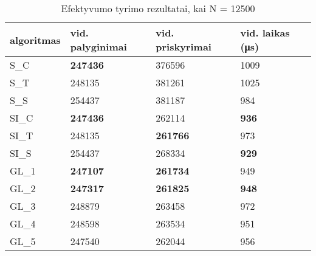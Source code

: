 \documentclass{VUMIFInfKursinis}
\begin{document}
\begin{table}[H]
  \caption{Efektyvumo tyrimo rezultatai, kai N = 12500}
  \label{results_12500}
  \centering
  \begin{tabular}{llll}
    algoritmas & vid. palyginimai                        & vid. priskyrimai                        & vid. laikas (μs)                     \\ \midrule
    S\_C       & \cellcolor[HTML]{70AD47}\textbf{247436} & 376596                                  & 1009                                 \\
    S\_T       & 248135                                  & 381261                                  & 1025                                 \\
    S\_S       & 254437                                  & 381187                                  & 984                                  \\
    SI\_C      & \cellcolor[HTML]{70AD47}\textbf{247436} & 262114                                  & \cellcolor[HTML]{70AD47}\textbf{936} \\
    SI\_T      & 248135                                  & \cellcolor[HTML]{70AD47}\textbf{261766} & 973                                  \\
    SI\_S      & 254437                                  & 268334                                  & \cellcolor[HTML]{70AD47}\textbf{929} \\
    GL\_1      & \cellcolor[HTML]{70AD47}\textbf{247107} & \cellcolor[HTML]{70AD47}\textbf{261734} & 949                                  \\
    GL\_2 & \cellcolor[HTML]{70AD47}\textbf{247317} & \cellcolor[HTML]{70AD47}\textbf{261825} & \cellcolor[HTML]{70AD47}\textbf{948} \\
    GL\_3      & 248879                                  & 263458                                  & 972                                  \\
    GL\_4      & 248598                                  & 263534                                  & 951                                  \\
    GL\_5      & 247540                                  & 262044                                  & 956                                  \\ \bottomrule       
  \end{tabular}
\end{table}
\end{document}
